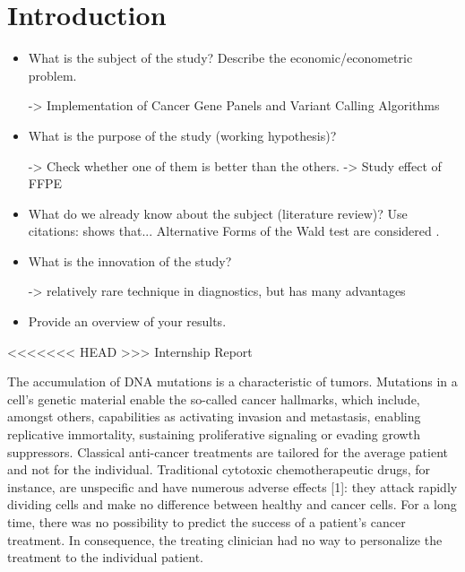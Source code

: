 \section{Introduction}

\begin{itemize}

\item What is the subject of the study? Describe the
economic/econometric problem.

-> Implementation of Cancer Gene Panels and Variant Calling Algorithms

\item What is the purpose of the study (working hypothesis)?

-> Check whether one of them is better than the others.
-> Study effect of FFPE

\item What do we already know about the subject (literature
review)? Use citations: { \cite{mutect:2013} shows that...
Alternative Forms of the Wald test are considered
\citep{Breusch&Schmidt:88}.}

\item What is the innovation of the study?

-> relatively rare technique in diagnostics, but has many advantages

\item Provide an overview of your results.


\end{itemize}

<<<<<<< HEAD
>>> Internship Report

The accumulation of DNA mutations is a characteristic of tumors. Mutations in a cell’s genetic material enable the so-called cancer hallmarks, which include, amongst others, capabilities as activating invasion and metastasis, enabling replicative immortality, sustaining proliferative signaling or evading growth suppressors. Classical anti-cancer treatments are tailored for the \„average patient\“ and not for the individual. Traditional cytotoxic chemotherapeutic drugs, for instance, are unspecific and have numerous adverse effects [1]: they attack rapidly dividing cells and make no difference between healthy and cancer cells. For a long time, there was no possibility to predict the success of a patient’s cancer treatment. In consequence, the treating clinician had no way to personalize the treatment to the individual patient.


